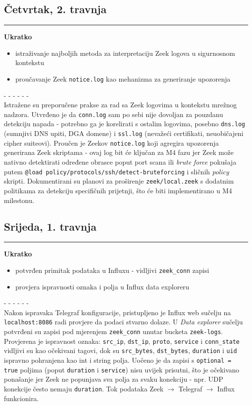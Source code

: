 \documentclass[12pt, a4paper]{article}
\newcommand{\dan}[1]{
    \subsection*{#1}
    \vspace{-0.5em} 
    \hrule \vspace{0.5em} 
}
\begin{document}
\dan{Četvrtak, 2. travnja}
\textbf{Ukratko}
\begin{itemize}
    \item istraživanje najboljih metoda za interpretaciju Zeek logova u sigurnosnom kontekstu
    \item proučavanje Zeek \lstinline|notice.log| kao mehanizma za generiranje upozorenja
\end{itemize}
- - - - - - \\
Istražene su preporučene prakse za rad sa Zeek logovima u kontekstu mrežnog nadzora.
Utvrđeno je da \lstinline|conn.log| sam po sebi nije dovoljan za pouzdanu detekciju napada -
potrebno ga je korelirati s ostalim logovima, posebno \lstinline|dns.log| (sumnjivi DNS upiti,
DGA domene) i \lstinline|ssl.log| (nevažeći certifikati, neuobičajeni cipher suiteovi).
Proučen je Zeekov \lstinline|notice.log| koji agregira upozorenja generirana Zeek skriptama -
ovaj log bit će ključan za M4 fazu jer Zeek može nativno detektirati određene obrasce
poput port scana ili \textit{brute force} pokušaja putem \lstinline|@load policy/protocols/ssh/detect-bruteforcing|
i sličnih \textit{policy} skripti.
Dokumentirani su planovi za proširenje \lstinline|zeek/local.zeek| s dodatnim politikama
za detekciju specifičnih prijetnji, što će biti implementirano u M4 milestonu.
 
\dan{Srijeda, 1. travnja}
\textbf{Ukratko}
\begin{itemize}
    \item potvrđen primitak podataka u Influxu - vidljivi \lstinline|zeek_conn| zapisi
    \item provjera ispravnosti oznaka i polja u Influx data exploreru
\end{itemize}
- - - - - - \\
Nakon ispravaka Telegraf konfiguracije, pristupljeno je Influx web sučelju na
\lstinline|localhost:8086| radi provjere da podaci stvarno dolaze.
U \textit{Data explorer} sučelju potvrđeni su zapisi pod mjerenjem \lstinline|zeek_conn|
unutar bucketa \lstinline|zeek-logs|.
Provjerena je ispravnost oznaka: \lstinline|src_ip|, \lstinline|dst_ip|, \lstinline|proto|,
\lstinline|service| i \lstinline|conn_state| vidljivi su kao očekivani tagovi, dok su
\lstinline|src_bytes|, \lstinline|dst_bytes|, \lstinline|duration| i \lstinline|uid|
ispravno pohranjena kao int i string polja.
Uočeno je da zapisi s \lstinline|optional = true| poljima (poput \lstinline|duration| i
\lstinline|service|) nisu uvijek prisutni, što je očekivano ponašanje jer Zeek ne popunjava
sva polja za svaku konekciju - npr. UDP konekcije često nemaju \lstinline|duration|.
Tok podataka Zeek $\rightarrow$ Telegraf $\rightarrow$ Influx funkcionira.
 
\end{document}
